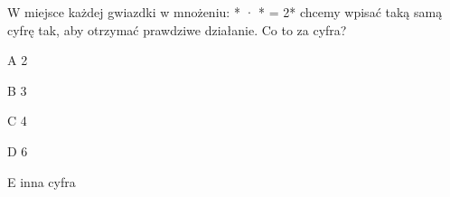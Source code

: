 \begin{tresc}
W miejsce każdej gwiazdki w mnożeniu: * · * = 2* chcemy wpisać taką samą cyfrę tak, aby otrzymać prawdziwe działanie. Co to za cyfra?
\end{tresc}
\begin{wariant}{A} 2 \end{wariant}
\begin{wariant}{B} 3 \end{wariant}
\begin{wariant}{C} 4 \end{wariant}
\begin{wariant}{D} 6 \end{wariant}
\begin{wariant}{E} inna cyfra \end{wariant}
